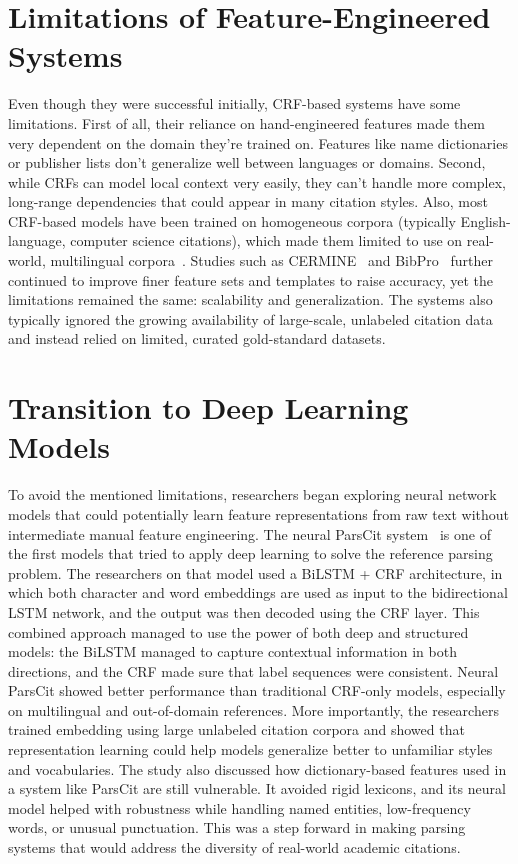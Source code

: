 \section{Limitations of Feature-Engineered Systems}
Even though they were successful initially, CRF-based systems have some limitations. First of all, their reliance on hand-engineered features made them very dependent on the domain they’re trained on. Features like name dictionaries or publisher lists don’t generalize well between languages or domains. Second, while CRFs can model local context very easily, they can’t handle more complex, long-range dependencies that could appear in many citation styles. Also, most CRF-based models have been trained on homogeneous corpora (typically English-language, computer science citations), which made them limited to use on real-world, multilingual corpora~\cite{prasad2018neuralparscit}.
Studies such as CERMINE~\cite{cermine} and BibPro~\cite{bibpro} further continued to improve finer feature sets and templates to raise accuracy, yet the limitations remained the same: scalability and generalization. The systems also typically ignored the growing availability of large-scale, unlabeled citation data and instead relied on limited, curated gold-standard datasets.

\section{Transition to Deep Learning Models}
To avoid the mentioned limitations, researchers began exploring neural network models that could potentially learn feature representations from raw text without intermediate manual feature engineering. The neural ParsCit system~\cite{prasad2018neuralparscit} is one of the first models that tried to apply deep learning to solve the reference parsing problem. The researchers on that model used a BiLSTM + CRF architecture, in which both character and word embeddings are used as input to the bidirectional LSTM network, and the output was then decoded using the CRF layer.
This combined approach managed to use the power of both deep and structured models: the BiLSTM managed to capture contextual information in both directions, and the CRF made sure that label sequences were consistent. Neural ParsCit showed better performance than traditional CRF-only models, especially on multilingual and out-of-domain references. More importantly, the researchers trained embedding using large unlabeled citation corpora and showed that representation learning could help models generalize better to unfamiliar styles and vocabularies.
The study also discussed how dictionary-based features used in a system like ParsCit are still vulnerable. It avoided rigid lexicons, and its neural model helped with robustness while handling named entities, low-frequency words, or unusual punctuation. This was a step forward in making parsing systems that would address the diversity of real-world academic citations.

